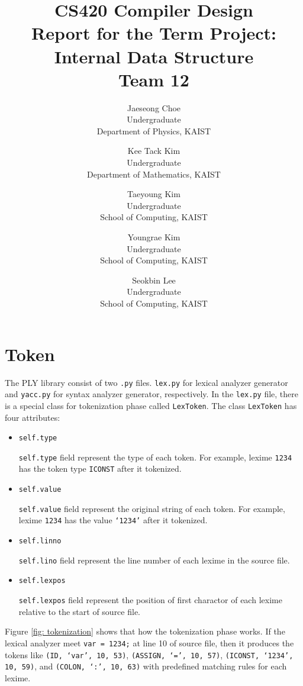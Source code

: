 \documentclass{article}
\title
{
	CS420 Compiler Design\\
	Report for the Term Project: Internal Data Structure\\
	${}$\\
	Team 12
}
\author
{
	Jaeseong Choe\\
	Undergraduate\\
	Department of Physics, KAIST
	\and
	Kee Tack Kim\\
	Undergraduate\\
	Department of Mathematics, KAIST
	\and
	Taeyoung Kim\\
	Undergraduate\\
	School of Computing, KAIST
	\and
	Youngrae Kim\\
	Undergraduate\\
	School of Computing, KAIST
	\and
	Seokbin Lee\\
	Undergraduate\\
	School of Computing, KAIST
}
\newcommand{\code}[1]{\texttt{#1}}
\begin{document}
	\maketitle
	
	\section{Token}
	
	The PLY library consist of two \code{.py} files. \code{lex.py} for lexical analyzer generator and \code{yacc.py} for syntax analyzer generator, respectively. In the \code{lex.py} file, there is a special class for tokenization phase called \code{LexToken}. The class \code{LexToken} has four attributes:
	
	\begin{itemize}
		\item \code{self.type}
		
		\code{self.type} field represent the type of each token. For example, lexime \code{1234} has the token type \code{ICONST} after it tokenized.

		\item \code{self.value}
		
		\code{self.value} field represent the original string of each token. For example, lexime \code{1234} has the value \code{`1234'} after it tokenized.

		\item \code{self.linno}
		
		\code{self.lino} field represent the line number of each lexime in the source file.

		\item \code{self.lexpos}
		
		\code{self.lexpos} field represent the position of first charactor of each lexime relative to the start of source file.
	\end{itemize}
	
	Figure \ref{fig: tokenization} shows that how the tokenization phase works. If the lexical analyzer meet \code{var = 1234;} at line 10 of source file, then it produces the tokens like \code{\code{(ID, `var', 10, 53)}}, \code{(ASSIGN, `=', 10, 57)}, \code{(ICONST, `1234', 10, 59)}, and \code{(COLON, `:', 10, 63)} with predefined matching rules for each lexime.
	
\end{document}
